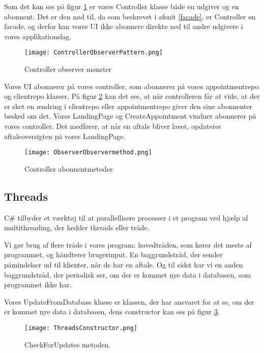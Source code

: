 Som det kan ses på figur \ref{fig:ControllerObserverPattern} er vores Controller klasse både en udgiver og en abonnent.
Det er den nød til, da som beskrevet i afsnit \ref{facade}, er Controller en facade, og derfor kan vores UI ikke abonnere direkte ned til andre udgivere i vores applikationslag.


\begin{figure}[h]
    \caption{Controller observer mønster}
    \centering
        \texttt{[image: ControllerObserverPattern.png]}
    \label{fig:ControllerObserverPattern}
\end{figure}

Vores UI abonnerer på vores controller, som abonnerer på vores appointmentrepo og clientrepo klasser.
På figur \ref{fig:ObserverObservermethod} kan det ses, at når controlleren får at vide, at der er sket en ændring i clientrepo eller appointmentrepo giver den sine abonnenter besked om det.
Vores LandingPage og CreateAppointment vinduer abonnerer på vores controller.
Det medfører, at når en aftale bliver lavet, opdateres aftaleoversigten på vores LandingPage.

\begin{figure}[h]
    \caption{Controller abonnentmetoder.}
    \centering
        \texttt{[image: ObserverObservermethod.png]}
    \label{fig:ObserverObservermethod}
\end{figure}

\subsection{Threads}
\label{thread}
C\# tilbyder et værktøj til at parallellisere processer i et program ved hjælp af multithreading, der hedder threads eller tråde.

Vi gør brug af flere tråde i vores program: hovedtråden, som kører det meste af programmet, og håndterer brugerinput.
En baggrundstråd, der sender påmindelser ud til klienter, når de har en aftale.
Og til sidst har vi en anden baggrundstråd, der periodisk ser, om der er kommet nye data i databasen, som programmet ikke har.

Vores UpdateFromDatabase klasse er klassen, der har ansvaret for at se, om der er kommet nye data i databasen, dens constructor kan ses på figur \ref{fig:threadsConstructor}.

\begin{figure}[h]
    \caption{CheckForUpdates metoden.}
    \centering
        \texttt{[image: ThreadsConstructor.png]}
    \label{fig:threadsConstructor}
\end{figure}

